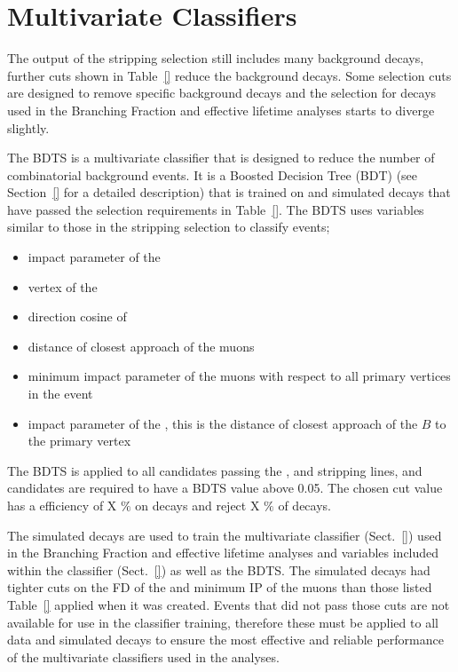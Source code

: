 \section{Multivariate Classifiers}
\label{sec:offline_sel}
The output of the stripping selection still includes many background decays, further cuts shown in Table~\ref{} reduce the background decays. Some selection cuts are designed to remove specific background decays and the selection for \bsmumu decays used in the Branching Fraction and effective lifetime analyses starts to diverge slightly.

The BDTS is a multivariate classifier that is designed to reduce the number of combinatorial background events. It is a Boosted Decision Tree (BDT) (see Section~\ref{} for a detailed description) that is trained on \bsmumu and \bbbarmumux simulated decays that have passed the \bmumu selection requirements in Table~\ref{}. The BDTS uses variables similar to those in the stripping selection to classify events;
\begin{itemize}
\item impact parameter \chisqd of the \bds
\item vertex \chisqd of the \bsd
\item direction cosine of 
\item distance of closest approach of the muons
\item minimum impact parameter \chisqd of the muons with respect to all primary vertices in the event
\item impact parameter of the \bsd, this is the distance of closest approach of the $B$ to the primary vertex
\end{itemize}
The BDTS is applied to all candidates passing the \bmumu, \bhh and \bujpsik stripping lines, and candidates are required to have a BDTS value above 0.05. The chosen cut value has a efficiency of X $\%$ on \bsmumu decays and reject X $\%$ of \bbbarmumux decays. 




The simulated \bbbarmumux decays are used to train the multivariate classifier (Sect.~\ref{}) used in the Branching Fraction and effective lifetime analyses and variables included within the classifier (Sect.~\ref{}) as well as the BDTS. The simulated \bbbarmumux decays had tighter cuts on the FD \chisqd of the \bsd and minimum IP \chisqd of the muons than those listed Table~\ref{} applied when it was created. Events that did not pass those cuts are not available for use in the classifier training, therefore these must be applied to all data and simulated decays to ensure the most effective and reliable performance of the multivariate classifiers used in the analyses. 




